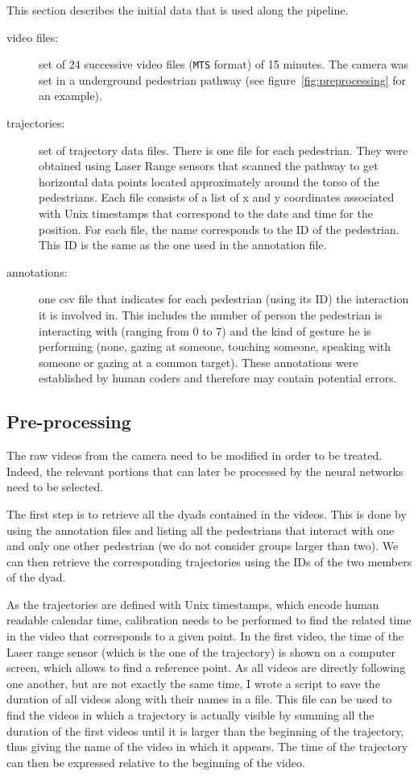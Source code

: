 \documentclass[12pt,a4paper,twoside]{article}
\begin{document}
This section describes the initial data that is used along the pipeline. 

\begin{description}
    \item[video files:] set of 24 successive video files (\texttt{MTS} format) of 15 minutes. The camera was set in a underground pedestrian pathway (see figure~\ref{fig:preprocessing} for an example).
    \item[trajectories:] set of trajectory data files. There is one file for each pedestrian. They were obtained using Laser Range sensors that scanned the pathway to get horizontal data points located approximately around the torso of the pedestrians. Each file consists of a list of x and y coordinates associated with Unix timestamps that correspond to the date and time for the position. For each file, the name corresponds to the ID of the pedestrian. This ID is the same as the one used in the annotation file.
    \item[annotations:] one csv file that indicates for each pedestrian (using its ID) the interaction it is involved in. This includes the number of person the pedestrian is interacting with (ranging from 0 to 7) and the kind of gesture he is performing (none, gazing at someone, touching someone, speaking with someone or gazing at a common target). These annotations were established by human coders and therefore may contain potential errors.
\end{description}

\subsection{Pre-processing}
The raw videos from the camera need to be modified in order to be treated. Indeed, the relevant portions that can later be processed by the neural networks need to be selected. 

The first step is to retrieve all the dyads contained in the videos. This is done by using the annotation files and listing all the pedestrians that interact with one and only one other pedestrian (we do not consider groups larger than two). We can then retrieve the corresponding trajectories using the IDs of the two members of the dyad.

As the trajectories are defined with Unix timestamps, which encode human readable calendar time, calibration needs to be performed to find the related time in the video that corresponds to a given point. In the first video, the time of the Laser range sensor (which is the one of the trajectory) is shown on a computer screen, which allows to find a reference point. As all videos are directly following one another, but are not exactly the same time, I wrote a script to save the duration of all videos along with their names in a file. This file can be used to find the videos in which a trajectory is actually visible by summing all the duration of the first videos until it is larger than the beginning of the trajectory, thus giving the name of the video in which it appears. The time of the trajectory can then be expressed relative to the beginning of the video. 
\end{document}
